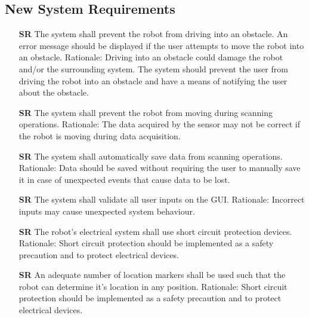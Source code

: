 \documentclass[12pt]{article}
\newcounter{srnum} %
\begin{document}
\subsection{New System Requirements}

\begin{itemize}

\item[\textbf{SR\refstepcounter{srnum}\thesrnum \label{SR1}}] The system shall prevent the robot from driving into an obstacle. An error message should be displayed if the user attempts to move the robot into an obstacle.
\newline Rationale: Driving into an obstacle could damage the robot and/or the surrounding system. The system should prevent the user from driving the robot into an obstacle and have a means of notifying the user about the obstacle.

\item[\textbf{SR\refstepcounter{srnum}\thesrnum \label{SR2}}] The system shall prevent the robot from moving during scanning operations.
\newline Rationale: The data acquired by the sensor may not be correct if the robot is moving during data acquisition.

\item[\textbf{SR\refstepcounter{srnum}\thesrnum \label{SR3}}] The system shall automatically save data from scanning operations.
\newline Rationale: Data should be saved without requiring the user to manually save it in case of unexpected events that cause data to be lost.

\item[\textbf{SR\refstepcounter{srnum}\thesrnum \label{SR5}}] The system shall validate all user inputs on the GUI.
\newline Rationale: Incorrect inputs may cause unexpected system behaviour.

\item[\textbf{SR\refstepcounter{srnum}\thesrnum \label{SR6}}] The robot's electrical system shall use short circuit protection devices.
\newline Rationale: Short circuit protection should be implemented as a safety precaution and to protect electrical devices.

\item[\textbf{SR\refstepcounter{srnum}\thesrnum \label{SR7}}] An adequate number of location markers shall be used such that the robot can determine it's location in any position.
\newline Rationale: Short circuit protection should be implemented as a safety precaution and to protect electrical devices.

\end{itemize}
\end{document}

